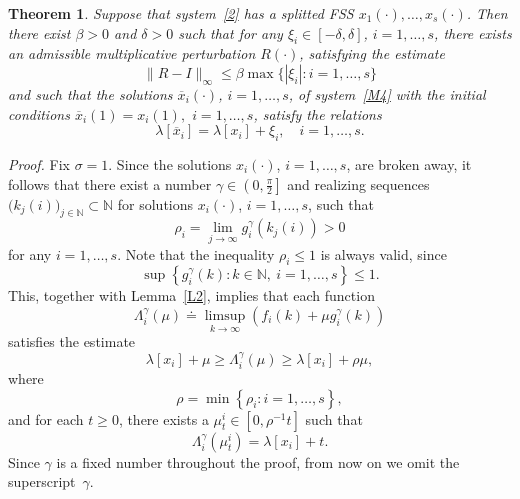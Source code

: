 \documentclass[11pt]{article}
\newtheorem{theorem}{Theorem}[section]
\begin{document}
\begin{theorem}
\it
\label{T6}Suppose that system~\eqref{2} has a splitted FSS 
$x_{1}(\cdot),\dots,x_{s}(\cdot)$. Then there exist $\beta>0$ and $\delta >0$ such
that for any $\xi_{i}\in [-\delta,\delta]$, $i=1,\dots ,s$,  there exists an admissible
multiplicative perturbation $R(\cdot )$, satisfying the estimate%
\begin{equation}
\| R-I\| _{\infty }\le \beta \max 
\bigl\{|\xi _{i}| \colon i=1,\dots ,s\bigr\}  
\label{X7}
\end{equation}%
and such that the solutions $\overline{x}_{i}(\cdot )$, $i=1,\ldots ,s$, of
system~\eqref{M4} with the initial conditions $\overline{x}_{i}(1)=x_{i}(1),$
$i=1,\dots ,s$, satisfy the relations%
\begin{equation*}
\lambda [ \overline{x}_{i}] =\lambda [ x_{i}]+\xi _{i},\quad i=1,\dots ,s.
\end{equation*}%
\end{theorem}

\emph{Proof.}
Fix $\sigma=1$. Since the solutions $x_{i}(\cdot )$, 
$i=1,\dots ,s$, are broken away, it follows that there exist a number 
$\gamma \in \left( 0,\frac{\pi }{2}\right] $ and realizing sequences 
$\bigl(k_{j}(i)\bigr)_{j\in \mathbb{N}}\subset \mathbb{N}$
for solutions $x_{i}(\cdot )$, $i=1,\dots ,s$, such that%
\begin{equation*}
\rho _{i}=\lim_{j\to \infty }g_{i}^{\gamma }( k_{j}(i)) >0
\end{equation*}%
for any $i=1,\dots ,s$. Note that the inequality $\rho _{i}\le 1$ is always
valid, since%
\begin{equation*}
\sup \left\{ g^{\gamma}_{i}(k)\colon k\in \mathbb{N},\ i=1,\dots ,s\right\} \le 1.
\end{equation*}%
This, together with Lemma~\ref{L2}, implies that each function 
\begin{equation*}
\Lambda _{i}^{\gamma }( \mu ) \doteq \limsup_{k\to \infty
}( f_{i}(k)+\mu g_{i}^{\gamma }(k))  
\end{equation*}%
satisfies the estimate%
\begin{equation}
\lambda [ x_{i}] +\mu \ge \Lambda _{i}^{\gamma }( \mu
) \ge \lambda [ x_{i}] +\rho \mu ,
\label{X2}
\end{equation}%
where%
\begin{equation*}
\rho =\min \left\{ \rho _{i}\colon i=1,\dots ,s\right\} ,
\end{equation*}%
and for each $t\ge 0$, there exists a $\mu _{t}^{i}\in [ 0,\rho ^{-1}t%
] $ such that%
\begin{equation}
\Lambda _{i}^{\gamma }( \mu _{t}^{i}) =\lambda [ x_{i}]
+t.  \label{X3}
\end{equation}%
Since $\gamma $ is a 
fixed number throughout the proof, from now on we omit the
superscript~$\gamma $.
\end{document}
